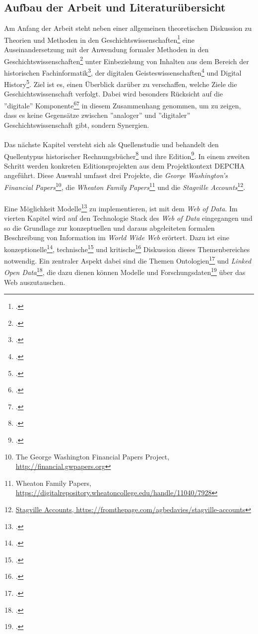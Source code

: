 \documentclass[12pt,a4paper]{article}
\begin{document}
\subsection{Aufbau der Arbeit und Literaturübersicht}
Am Anfang der Arbeit steht neben einer allgemeinen theoretischen Diskussion zu Theorien und Methoden in den Geschichtswissenschaften\footcite{jordan2018theorien} eine Auseinandersetzung mit der Anwendung formaler Methoden in den Geschichtswissenschaften\footcite{thaller2017ungefahre} unter Einbeziehung von Inhalten aus dem Bereich der historischen Fachinformatik\footcite{thaller2017historical}, der digitalen Geisteswissenschaften\footcite{jannidis2017digital} und Digital History\footcite{graham2015exploring}. Ziel ist es, einen Überblick darüber zu verschaffen, welche Ziele die Geschichtswissenschaft verfolgt. Dabei wird besonders Rücksicht auf die ''digitale'' Komponente\footcite{fohr2017historische}\footcite{wintergrun2019netzwerkanalysen} in diesem Zusammenhang genommen, um zu zeigen, dass es keine Gegensätze zwischen ''analoger'' und ''digitaler'' Geschichtswissenschaft gibt, sondern Synergien.
\\
\\
Das nächste Kapitel versteht sich als Quellenstudie und behandelt den Quellentypus historischer Rechnungsbücher\footcite{gleba2015wirtschafts} und ihre Edition\footcite{vogeler2015mittelalterliche}. In einem zweiten Schritt werden konkreten Editionsprojekten aus dem Projektkontext DEPCHA angeführt. Diese Auswahl umfasst drei Projekte, die \textit{George Washington’s Financial Papers}\footnote{The George Washington Financial Papers Project, \url{http://financial.gwpapers.org}}, die \textit{Wheaton Family Papers}\footnote{Wheaton Family Papers, \url{https://digitalrepository.wheatoncollege.edu/handle/11040/7928}} und die \textit{Stagville Accounts}\footnote{\url{Stagville Accounts, https://fromthepage.com/agbedavies/stagville-accounts}}.
\\
\\
Eine Möglichkeit Modelle\footcite[Dem Modellbegriff folgend nach:][]{stachowiak1973allgemeine} zu implementieren, ist mit dem \textit{Web of Data}. Im vierten Kapitel wird auf den Technologie Stack des \textit{Web of Data} eingegangen und so die Grundlage zur konzeptuellen und daraus abgeleiteten formalen Beschreibung von Information im \textit{World Wide Web} erörtert. Dazu ist eine konzeptionelle\footcite{berners2001semantic}, technische\footcite{bernstein2016new} und kritische\footcite{swartz2013aaron} Diskussion dieses Themenbereiches notwendig. Ein zentraler Aspekt dabei sind die Themen Ontologien\footcite{stuckenschmidt2009ontologien} und \textit{Linked Open Data}\footcite{bauer2011linked}, die dazu dienen können Modelle und Forschungsdaten\footcite{neher2011semantische} über das Web auszutauschen.
\end{document}
